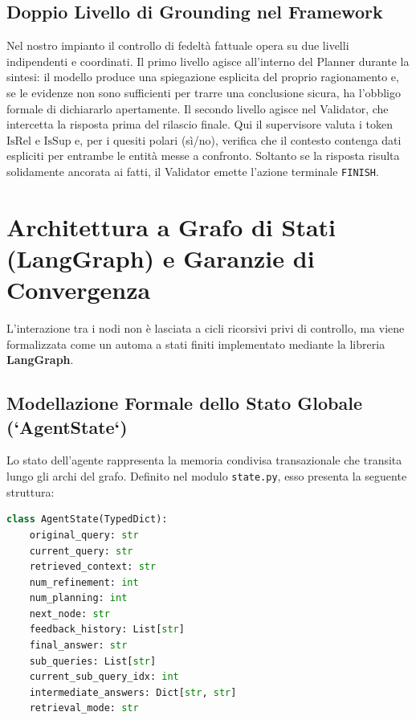 \subsection{Doppio Livello di Grounding nel Framework}
Nel nostro impianto il controllo di fedeltà fattuale opera su due livelli indipendenti e coordinati. Il primo livello agisce all'interno del Planner durante la sintesi: il modello produce una spiegazione esplicita del proprio ragionamento e, se le evidenze non sono sufficienti per trarre una conclusione sicura, ha l'obbligo formale di dichiararlo apertamente. Il secondo livello agisce nel Validator, che intercetta la risposta prima del rilascio finale. Qui il supervisore valuta i token $\text{IsRel}$ e $\text{IsSup}$ e, per i quesiti polari (sì/no), verifica che il contesto contenga dati espliciti per entrambe le entità messe a confronto. Soltanto se la risposta risulta solidamente ancorata ai fatti, il Validator emette l'azione terminale \texttt{FINISH}.

\section{Architettura a Grafo di Stati (LangGraph) e Garanzie di Convergenza}
\label{sec:langgraph_convergenza}

L'interazione tra i nodi non è lasciata a cicli ricorsivi privi di controllo, ma viene formalizzata come un automa a stati finiti implementato mediante la libreria \textbf{LangGraph}.

\subsection{Modellazione Formale dello Stato Globale (`AgentState`)}
Lo stato dell'agente rappresenta la memoria condivisa transazionale che transita lungo gli archi del grafo. Definito nel modulo \texttt{state.py}, esso presenta la seguente struttura:
\begin{lstlisting}[language=Python]
class AgentState(TypedDict):
    original_query: str
    current_query: str
    retrieved_context: str
    num_refinement: int
    num_planning: int
    next_node: str
    feedback_history: List[str]
    final_answer: str
    sub_queries: List[str]
    current_sub_query_idx: int
    intermediate_answers: Dict[str, str]
    retrieval_mode: str
\end{lstlisting}

